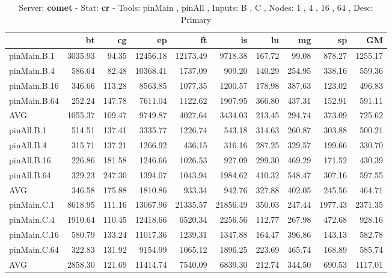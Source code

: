 \begin{table*}[]
\caption{Server: \textbf{comet} - 
 Stat: \textbf{cr} - 
 Tools: pinMain , pinAll ,  
 Inputs: B , C ,  
 Nodes: 1 , 4 , 16 , 64 ,  
 Desc: Primary}
\label{comet_cr_pMpA_BC_itn_p3.5}\begin{center}
\begin{tabular}{lrrrrrrrrr}
\hline
              &      bt &     cg &       ep &       ft &       is &     lu &     mg &      sp &      GM \\
\hline
 pinMain.B.1  & 3035.93 &  94.35 & 12456.18 & 12173.49 &  9718.38 & 167.72 &  99.08 &  878.27 & 1255.17 \\
 pinMain.B.4  &  586.64 &  82.48 & 10368.41 &  1737.09 &   909.20 & 140.29 & 254.95 &  338.16 &  559.36 \\
 pinMain.B.16 &  346.66 & 113.28 &  8563.85 &  1077.35 &  1200.57 & 178.98 & 387.63 &  123.02 &  496.83 \\
 pinMain.B.64 &  252.24 & 147.78 &  7611.04 &  1122.62 &  1907.95 & 366.80 & 437.31 &  152.91 &  591.11 \\
 AVG          & 1055.37 & 109.47 &  9749.87 &  4027.64 &  3434.03 & 213.45 & 294.74 &  373.09 &  725.62 \\
 pinAll.B.1   &  514.51 & 137.41 &  3335.77 &  1226.74 &   543.18 & 314.63 & 260.87 &  303.88 &  500.21 \\
 pinAll.B.4   &  315.71 & 137.21 &  1266.92 &   436.15 &   316.16 & 287.25 & 329.57 &  199.66 &  330.70 \\
 pinAll.B.16  &  226.86 & 181.58 &  1246.66 &  1026.53 &   927.09 & 299.30 & 469.29 &  171.52 &  430.39 \\
 pinAll.B.64  &  329.23 & 247.30 &  1394.07 &  1043.94 &  1984.62 & 410.32 & 548.47 &  307.16 &  597.55 \\
 AVG          &  346.58 & 175.88 &  1810.86 &   933.34 &   942.76 & 327.88 & 402.05 &  245.56 &  464.71 \\
 pinMain.C.1  & 8618.95 & 111.16 & 13067.96 & 21335.57 & 21856.49 & 350.03 & 247.44 & 1977.43 & 2371.35 \\
 pinMain.C.4  & 1910.64 & 110.45 & 12418.66 &  6520.34 &  2256.56 & 112.77 & 267.98 &  472.68 &  928.16 \\
 pinMain.C.16 &  580.79 & 133.24 & 11017.36 &  1239.31 &  1347.88 & 164.47 & 396.86 &  143.13 &  582.78 \\
 pinMain.C.64 &  322.83 & 131.92 &  9154.99 &  1065.12 &  1896.25 & 223.69 & 465.74 &  168.89 &  585.74 \\
 AVG          & 2858.30 & 121.69 & 11414.74 &  7540.09 &  6839.30 & 212.74 & 344.50 &  690.53 & 1117.01 \\

\end{tabular}
\end{center}
\end{table*}
